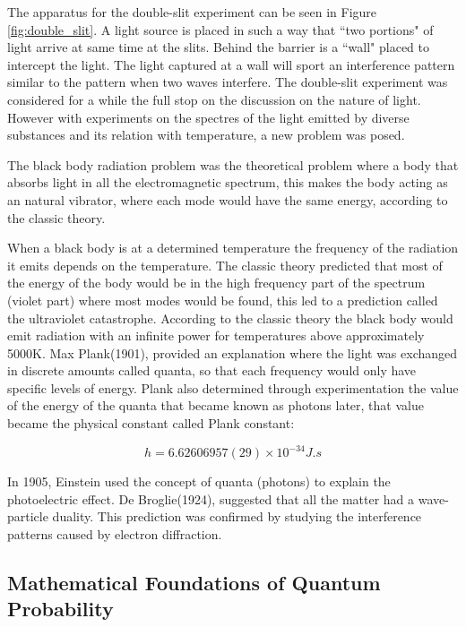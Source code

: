 The apparatus for the double-slit experiment can be seen in Figure \ref{fig:double_slit}. A light source is placed in such a way that ``two portions" of light arrive at same time at the slits. Behind the barrier is a ``wall" placed to intercept the light. 
The light captured at a wall will sport an interference pattern similar to the pattern when two  waves interfere.
The double-slit experiment was considered for a while the full stop on the discussion on the nature of light.
However with experiments on the spectres of the light emitted by diverse substances and its relation with temperature, a new problem was posed. 


The black body radiation problem was the theoretical problem where a body that absorbs light in all the electromagnetic spectrum, this makes the body acting as an natural vibrator, where each mode would have the same energy, according to the classic theory. 

When a black body is at a determined temperature the frequency of the radiation it emits depends on the temperature. The classic theory predicted that most of the energy of the body would be in the high frequency part of the spectrum (violet part) where most modes would be found, this led to a prediction called the ultraviolet catastrophe. According to the classic theory the black body would emit radiation with an infinite power for temperatures above approximately 5000K. 
Max Plank(1901), provided an explanation where the light was exchanged in discrete amounts called quanta, so that each frequency would only have specific levels of energy. Plank also determined through experimentation the value of the energy of the quanta that became known as photons later, that value became the physical constant called Plank constant:

\begin{equation}
\label{eq:plankconstant}
h = 6.62606957(29) \times 10^{-34} J.s
\end{equation}

In 1905, Einstein used the concept of quanta (photons) to explain the photoelectric effect. 
De Broglie(1924), suggested that all the matter had a wave-particle duality. This prediction was confirmed by studying the interference patterns caused by electron diffraction.


\subsection{Mathematical Foundations of Quantum Probability} 
\label{subsec:mathematical_foundations}

